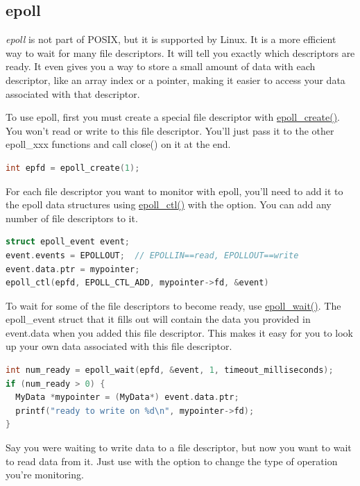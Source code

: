 \subsection{epoll}

\emph{epoll} is not part of POSIX, but it is supported by Linux.
It is a more efficient way to wait for many file descriptors.
It will tell you exactly which descriptors are ready.
It even gives you a way to store a small amount of data with each descriptor, like an array index or a pointer, making it easier to access your data associated with that descriptor.

To use epoll, first you must create a special file descriptor with \href{http://linux.die.net/man/2/epoll_create}{epoll\_create()}.
You won't read or write to this file descriptor.
You'll just pass it to the other epoll\_xxx functions and call close() on it at the end.

\begin{lstlisting}[language=C]
int epfd = epoll_create(1);
\end{lstlisting}

For each file descriptor you want to monitor with epoll, you'll need to add it to the epoll data structures using \href{http://linux.die.net/man/2/epoll_ctl}{epoll\_ctl()} with the  option.
You can add any number of file descriptors to it.

\begin{lstlisting}[language=C]
struct epoll_event event;
event.events = EPOLLOUT;  // EPOLLIN==read, EPOLLOUT==write
event.data.ptr = mypointer;
epoll_ctl(epfd, EPOLL_CTL_ADD, mypointer->fd, &event)
\end{lstlisting}

To wait for some of the file descriptors to become ready, use \href{http://linux.die.net/man/2/epoll_wait}{epoll\_wait()}.
The epoll\_event struct that it fills out will contain the data you provided in event.data when you added this file descriptor.
This makes it easy for you to look up your own data associated with this file descriptor.

\begin{lstlisting}[language=C]
int num_ready = epoll_wait(epfd, &event, 1, timeout_milliseconds);
if (num_ready > 0) {
  MyData *mypointer = (MyData*) event.data.ptr;
  printf("ready to write on %d\n", mypointer->fd);
}
\end{lstlisting}

Say you were waiting to write data to a file descriptor, but now you want to wait to read data from it.
Just use  with the  option to change the type of operation you're monitoring.

